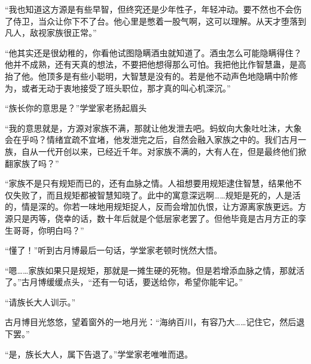\begin{this_body}
“我也知道这方源是有些早智，但终究还是少年性子，年轻冲动。要不然也不会伤了侍卫，当众让你下不了台。他心里是憋着一股气啊，这可以理解。从天才堕落到凡人，敌视家族很正常。”

“他其实还是很幼稚的，你看他试图隐瞒酒虫就知道了。酒虫怎么可能隐瞒得住？他并不成熟，还有天真的想法，不要把他想得那么可怕。我把他比作智慧蛊，是高抬了他。他顶多是有些小聪明，大智慧是没有的。若是他不动声色地隐瞒中阶修为，或者无动于衷地接受了班头职位，那才真的叫心机深沉。”

“族长你的意思是？”学堂家老扬起眉头

“我的意思就是，方源对家族不满，那就让他发泄去吧。蚂蚁向大象吐吐沫，大象会在乎吗？情绪宜疏不宜堵，他发泄完之后，自然会融入家族之中的。我们古月一族，自从一代开创以来，已经近千年。对家族不满的，大有人在，但是最终他们掀翻家族了吗？”

“家族不是只有规矩而已的，还有血脉之情。人祖想要用规矩逮住智慧，结果他不仅失败了，而且规矩都被智慧知晓了。此中的寓意深远啊……规矩是死的，人是活的，情是深的。你若一味地用规矩捉人，反而会增加仇恨，让方源离家族更远。方源只是丙等，侥幸的话，数十年后就是个低层家老罢了。但他毕竟是古月方正的孪生哥哥，你明白吗？”

“懂了！”听到古月博最后一句话，学堂家老顿时恍然大悟。

“嗯……家族如果只是规矩，那就是一摊生硬的死物。但是若增添血脉之情，那就活了。”古月博缓缓点头，“还有一句话，要送给你，希望你能牢记。”

“请族长大人训示。”

古月博目光悠悠，望着窗外的一地月光：“海纳百川，有容乃大……记住它，然后退下罢。”

“是，族长大人，属下告退了。”学堂家老唯唯而退。

\end{this_body}

